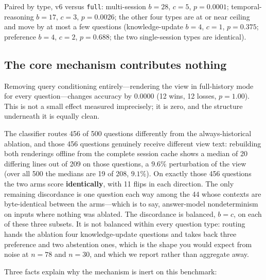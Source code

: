 \documentclass[11pt]{article}
\newcommand{\arm}[1]{\texttt{#1}}
\begin{document}
Paired by type, v6 versus \arm{full}: multi-session $b = 28$, $c = 5$, $p = 0.0001$; temporal-reasoning $b = 17$, $c = 3$, $p = 0.0026$; the other four types are at or near ceiling and move by at most a few questions (knowledge-update $b = 4$, $c = 1$, $p = 0.375$; preference $b = 4$, $c = 2$, $p = 0.688$; the two single-session types are identical).

\subsection{The core mechanism contributes nothing}
\label{sec:null}

Removing query conditioning entirely---rendering the view in full-history mode for every question---changes accuracy by $\mathbf{0.0000}$ (12 wins, 12 losses, $p = 1.00$). This is not a small effect measured imprecisely; it is zero, and the structure underneath it is equally clean.

The classifier routes 456 of 500 questions differently from the always-historical ablation, and those 456 questions genuinely receive different view text: rebuilding both renderings offline from the complete session cache shows a median of 20 differing lines out of 209 on those questions, a $9.6\%$ perturbation of the view (over all 500 the medians are 19 of 208, $9.1\%$). On exactly those 456 questions the two arms score \textbf{identically}, with 11 flips in each direction. The only remaining discordance is one question each way among the 44 whose contexts are byte-identical between the arms---which is to say, answer-model nondeterminism on inputs where nothing was ablated. The discordance is balanced, $b = c$, on each of these three subsets. It is not balanced within every question type: routing hands the ablation four knowledge-update questions and takes back three preference and two abstention ones, which is the shape you would expect from noise at $n = 78$ and $n = 30$, and which we report rather than aggregate away.

Three facts explain why the mechanism is inert on this benchmark:
\end{document}
